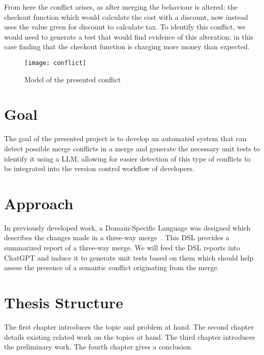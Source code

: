 From here the conflict arises, as after merging the behaviour is altered: the checkout function which would calculate the cost with a discount, now instead uses the value given for discount to calculate tax. To identify this conflict, we would need to generate a test that would find evidence of this alteration: in this case finding that the checkout function is charging more money than expected.

\begin{figure}[t]
    \texttt{[image: conflict]}
    \caption{Model of the presented conflict}
    \label{fig:arch}
\end{figure}

\section{Goal} \label{sec:goal}

The goal of the presented project is to develop an automated system that can detect possible merge conflicts in a merge and generate the necessary unit tests to identify it using a LLM, allowing for easier detection of this type of conflicts to be integrated into the version control workflow of developers.

\section{Approach} \label{sec:approach}

In previously developed work, a Domain-Specific Language was designed which describes the changes made in a three-way merge~\citep{kn:nuno}. This DSL provides a summarized report of a three-way merge. We will feed the DSL reports into ChatGPT and induce it to generate unit tests based on them which should help assess the presence of a semantic conflict originating from the merge.






\section{Thesis Structure} \label{sec:struct}


The first chapter introduces the topic and problem at hand.
The second chapter details existing related work on the topics at hand.
The third chapter introduces the preliminary work.
The fourth chapter gives a conclusion.